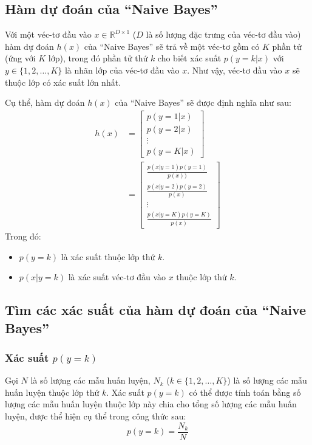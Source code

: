 \subsection{Hàm dự đoán của ``Naive Bayes''}
Với một véc-tơ đầu vào $x \in \mathbb{R}^{D\times 1}$ ($D$ là số lượng đặc trưng của véc-tơ đầu vào) hàm dự đoán $h(x)$ của ``Naive Bayes'' sẽ trả về một véc-tơ gồm có $K$ phần tử (ứng với $K$ lớp), trong đó phần tử thứ $k$ cho biết xác suất $p(y=k|x)$ với $y \in \{1,2,\dots,K\}$ là nhãn lớp của véc-tơ đầu vào $x$. Như vậy, véc-tơ đầu vào $x$ sẽ thuộc lớp có xác suất lớn nhất. 

Cụ thể, hàm dự đoán $h(x)$ của ``Naive Bayes'' sẽ được định nghĩa như sau:
\begin{equation}\label{eq:2.3_hx}
    \begin{split}
        h(x) &= 
        \begin{bmatrix}
            p(y=1|x)\\
            p(y=2|x)\\
            \vdots\\
            p(y=K|x)
        \end{bmatrix}\\
        &= 
        \begin{bmatrix}
            \frac{p(x|y=1)p(y=1)}{p(x))}\\
            \frac{p(x|y=2)p(y=2)}{p(x)}\\
            \vdots\\
            \frac{p(x|y=K)p(y=K)}{p(x)}
        \end{bmatrix}
    \end{split}
\end{equation}
Trong đó:
\begin{itemize}
    \item $p(y=k)$ là xác suất thuộc lớp thứ $k$.
    \item $p(x|y=k)$ là xác suất véc-tơ đầu vào $x$ thuộc lớp thứ $k$.
\end{itemize}

\subsection{Tìm các xác suất của hàm dự đoán của ``Naive Bayes''}
\subsubsection{Xác suất $p(y=k)$}
Gọi $N$ là số lượng các mẫu huấn luyện, $N_k$ ($k \in \{1,2,\dots,K\}$) là số lượng các mẫu huấn luyện thuộc lớp thứ $k$. Xác suất $p(y=k)$ có thể được tính toán bằng số lượng các mẫu huấn luyện thuộc lớp này chia cho tổng số lượng các mẫu huấn luyện, được thể hiện cụ thể trong công thức sau:
\begin{equation}
    \label{eq:2.3_p(y)}
    p(y=k) = \frac{N_k}{N}
\end{equation}

